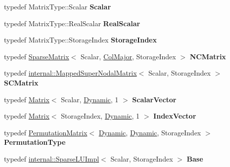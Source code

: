 \begin{DoxyCompactItemize}
\mbox{\label{group___sparse_l_u___module_a105a0173a3e2ff548bc643c7c4f6c149}} 
typedef Matrix\+Type\+::\+Scalar {\bfseries Scalar}
\item 
\mbox{\label{group___sparse_l_u___module_a7569faba9d46aee2e8ffcf396bf09089}} 
typedef Matrix\+Type\+::\+Real\+Scalar {\bfseries Real\+Scalar}
\item 
\mbox{\label{group___sparse_l_u___module_a8111a1271e3ba9a4995ff78837d816f5}} 
typedef Matrix\+Type\+::\+Storage\+Index {\bfseries Storage\+Index}
\item 
\mbox{\label{group___sparse_l_u___module_af1fb9b86b237b26d2148df843bc41220}} 
typedef \hyperlink{group___sparse_core___module_class_eigen_1_1_sparse_matrix}{Sparse\+Matrix}$<$ Scalar, \hyperlink{group__enums_ggaacded1a18ae58b0f554751f6cdf9eb13a0cbd4bdd0abcfc0224c5fcb5e4f6669a}{Col\+Major}, Storage\+Index $>$ {\bfseries N\+C\+Matrix}
\item 
\mbox{\label{group___sparse_l_u___module_a1629a0610cbb03e5a4fa9b508ae4a4b6}} 
typedef \hyperlink{group___sparse_l_u___module_class_eigen_1_1internal_1_1_mapped_super_nodal_matrix}{internal\+::\+Mapped\+Super\+Nodal\+Matrix}$<$ Scalar, Storage\+Index $>$ {\bfseries S\+C\+Matrix}
\item 
\mbox{\label{group___sparse_l_u___module_ac67621b3c8526fc5606a7a708427a959}} 
typedef \hyperlink{group___core___module_class_eigen_1_1_matrix}{Matrix}$<$ Scalar, \hyperlink{namespace_eigen_ad81fa7195215a0ce30017dfac309f0b2}{Dynamic}, 1 $>$ {\bfseries Scalar\+Vector}
\item 
\mbox{\label{group___sparse_l_u___module_a2564483882d758a16067085798d3e8ad}} 
typedef \hyperlink{group___core___module_class_eigen_1_1_matrix}{Matrix}$<$ Storage\+Index, \hyperlink{namespace_eigen_ad81fa7195215a0ce30017dfac309f0b2}{Dynamic}, 1 $>$ {\bfseries Index\+Vector}
\item 
\mbox{\label{group___sparse_l_u___module_a56c15a8364c3dea625d1f1404e7b07d1}} 
typedef \hyperlink{group___core___module_class_eigen_1_1_permutation_matrix}{Permutation\+Matrix}$<$ \hyperlink{namespace_eigen_ad81fa7195215a0ce30017dfac309f0b2}{Dynamic}, \hyperlink{namespace_eigen_ad81fa7195215a0ce30017dfac309f0b2}{Dynamic}, Storage\+Index $>$ {\bfseries Permutation\+Type}
\item 
\mbox{\label{group___sparse_l_u___module_ae4f85e309c65f3f93cbc96a43c39336d}} 
typedef \hyperlink{group___sparse_l_u___module_class_eigen_1_1internal_1_1_sparse_l_u_impl}{internal\+::\+Sparse\+L\+U\+Impl}$<$ Scalar, Storage\+Index $>$ {\bfseries Base}
\end{DoxyCompactItemize}
